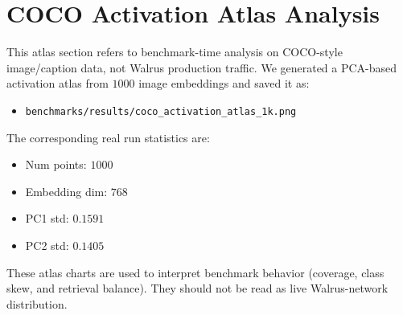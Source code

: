 \documentclass[11pt]{article}
\begin{document}
\section{COCO Activation Atlas Analysis}
This atlas section refers to benchmark-time analysis on COCO-style image/caption data,
not Walrus production traffic. We generated a PCA-based activation atlas from \(1000\)
image embeddings and saved it as:
\begin{itemize}[leftmargin=1.2em]
  \item \texttt{benchmarks/results/coco\_activation\_atlas\_1k.png}
\end{itemize}

The corresponding real run statistics are:
\begin{itemize}[leftmargin=1.2em]
  \item Num points: \(1000\)
  \item Embedding dim: \(768\)
  \item PC1 std: \(0.1591\)
  \item PC2 std: \(0.1405\)
\end{itemize}

\begin{center}
\end{center}

These atlas charts are used to interpret benchmark behavior (coverage, class skew,
and retrieval balance). They should not be read as live Walrus-network distribution.
\end{document}
